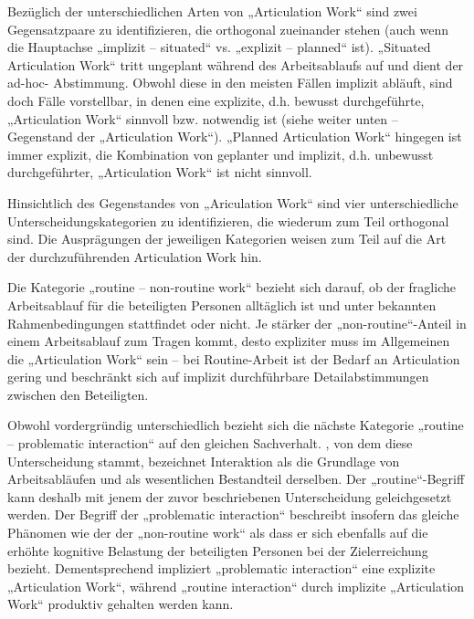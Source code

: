 Bezüglich der unterschiedlichen Arten von „Articulation Work“ sind zwei Gegensatzpaare zu identifizieren, die orthogonal zueinander stehen (auch wenn die Hauptachse „implizit -- situated“ vs. „explizit -- planned“ ist). „Situated Articulation Work“ tritt ungeplant während des Arbeitsablaufs auf und dient der ad-hoc- Abstimmung. Obwohl diese in den meisten Fällen implizit abläuft, sind doch Fälle vorstellbar, in denen eine explizite, d.h. bewusst durchgeführte, „Articulation Work“ sinnvoll bzw. notwendig ist (siehe weiter unten -- Gegenstand der „Articulation Work“). „Planned Articulation Work“ hingegen ist immer explizit, die Kombination von geplanter und implizit, d.h. unbewusst durchgeführter, „Articulation Work“ ist nicht sinnvoll.

Hinsichtlich des Gegenstandes von „Ariculation Work“ sind vier unterschiedliche Unterscheidungskategorien zu identifizieren, die wiederum zum Teil orthogonal sind. Die Ausprägungen der jeweiligen Kategorien weisen zum Teil auf die Art der durchzuführenden Articulation Work hin. 

Die Kategorie „routine -- non-routine work“ bezieht sich darauf, ob der fragliche Arbeitsablauf für die beteiligten Personen alltäglich ist und unter bekannten Rahmenbedingungen stattfindet oder nicht. Je stärker der „non-routine“-Anteil in einem Arbeitsablauf zum Tragen kommt, desto expliziter muss im Allgemeinen die „Articulation Work“ sein -- bei Routine-Arbeit ist der Bedarf an Articulation gering und beschränkt sich auf implizit durchführbare Detailabstimmungen zwischen den Beteiligten. 

Obwohl vordergründig unterschiedlich bezieht sich die nächste Kategorie „routine -- problematic interaction“ auf den gleichen Sachverhalt. \citet{Strauss93}, von dem diese Unterscheidung stammt, bezeichnet Interaktion als die Grundlage von Arbeitsabläufen und als wesentlichen Bestandteil derselben. Der „routine“-Begriff kann deshalb mit jenem der zuvor beschriebenen Unterscheidung geleichgesetzt werden. Der Begriff der „problematic interaction“ beschreibt insofern das gleiche Phänomen wie der der „non-routine work“ als dass er sich ebenfalls auf die erhöhte kognitive Belastung der beteiligten Personen bei der Zielerreichung bezieht. Dementsprechend impliziert „problematic interaction“ eine explizite „Articulation Work“, während „routine interaction“ durch implizite „Articulation Work“ produktiv gehalten werden kann.

